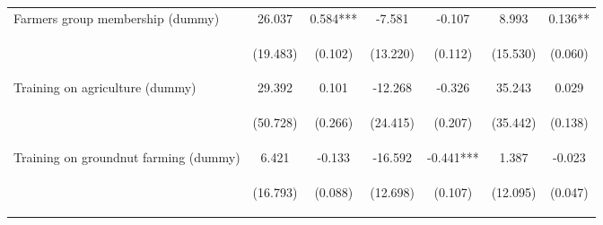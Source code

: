 \begin{center}
\begin{tabular}{lcccccc}
Farmers group membership (dummy) & 26.037 & 0.584*** & -7.581 & -0.107 & 8.993 & 0.136** \\
\vspace{4pt} & \begin{footnotesize}(19.483)\end{footnotesize} & \begin{footnotesize}(0.102)\end{footnotesize} & \begin{footnotesize}(13.220)\end{footnotesize} & \begin{footnotesize}(0.112)\end{footnotesize} & \begin{footnotesize}(15.530)\end{footnotesize} & \begin{footnotesize}(0.060)\end{footnotesize} \\
Training on agriculture (dummy) & 29.392 & 0.101 & -12.268 & -0.326 & 35.243 & 0.029 \\
\vspace{4pt} & \begin{footnotesize}(50.728)\end{footnotesize} & \begin{footnotesize}(0.266)\end{footnotesize} & \begin{footnotesize}(24.415)\end{footnotesize} & \begin{footnotesize}(0.207)\end{footnotesize} & \begin{footnotesize}(35.442)\end{footnotesize} & \begin{footnotesize}(0.138)\end{footnotesize} \\
Training on groundnut farming (dummy) & 6.421 & -0.133 & -16.592 & -0.441*** & 1.387 & -0.023 \\
\vspace{4pt} & \begin{footnotesize}(16.793)\end{footnotesize} & \begin{footnotesize}(0.088)\end{footnotesize} & \begin{footnotesize}(12.698)\end{footnotesize} & \begin{footnotesize}(0.107)\end{footnotesize} & \begin{footnotesize}(12.095)\end{footnotesize} & \begin{footnotesize}(0.047)\end{footnotesize} \\

\end{tabular}
\end{center}
